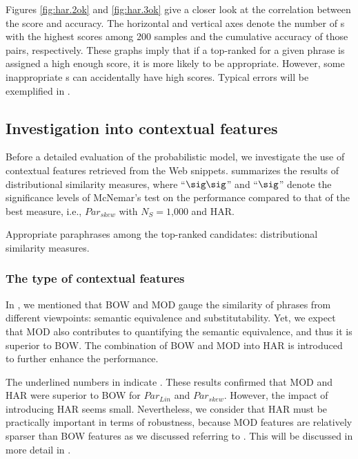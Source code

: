 \documentclass[english]{jnlp_1.4}
\begin{document}
Figures \ref{fig:har.2ok} and \ref{fig:har.3ok} give a closer look at
the correlation between the score and accuracy.  The horizontal and
vertical axes denote the number of {\pcp}s with the highest scores
among 200 samples and the cumulative accuracy of those pairs,
respectively.
These graphs imply that if a top-ranked {\pc} for a given phrase is
assigned a high enough score, it is more likely to be appropriate.
However, some inappropriate {\pcp}s can accidentally have high scores.
Typical errors will be exemplified in .

\subsection{Investigation into contextual features}
\label{ssec:ev-gen-common}

Before a detailed evaluation of the probabilistic model, we
investigate the use of contextual features retrieved from the Web
snippets.   summarizes the results of distributional
similarity measures, where ``$\sig\sig$'' and ``$\sig$'' denote the
significance levels of McNemar's test on the performance compared to
that of the best measure, i.e., $\mathit{Par_{skew}}$ with
$N_{S}=\text{1,000}$ and HAR.

\begin{table}[t]
\caption{Appropriate paraphrases among the top-ranked candidates:
  distributional similarity measures.}
\label{tab:gen-baseline}

\end{table}


\subsubsection{The type of contextual features}

In , we mentioned that BOW and MOD gauge the
similarity of phrases from different viewpoints: semantic equivalence
and substitutability.  Yet, we expect that MOD also contributes to
quantifying the semantic equivalence, and thus it is superior to BOW.
The combination of BOW and MOD into HAR is introduced to further
enhance the performance.

The underlined numbers in  indicate {\compfeat}.
These results confirmed that MOD and HAR were superior to BOW for
$\mathit{Par_{Lin}}$ and $\mathit{Par_{skew}}$.  However, the impact
of introducing HAR seems small.  Nevertheless, we consider that HAR
must be practically important in terms of robustness, because MOD
features are relatively sparser than BOW features as we discussed
referring to .  This will be discussed in more detail in
.
\end{document}
